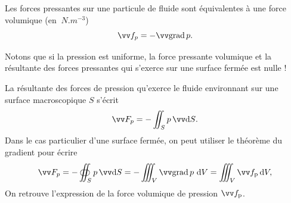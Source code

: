 \documentclass[12pt,fancy]{cours}
\begin{document}
\begin{theorem}\label{form:stat_flu}
  Les forces pressantes sur une particule de fluide sont équivalentes à une force volumique (en $\SI{}{N.m^{-3}}$)
  \begin{equation*}
    \Vec{f_p} = -\Grad{p}.
  \end{equation*}
\end{theorem}
\begin{remarque}
  Notons que si la pression est uniforme, la force pressante volumique et la résultante des forces pressantes qui s'exerce sur une surface fermée est nulle !
\end{remarque}

\begin{remarque}
  
  La résultante des forces de pression qu'exerce le fluide environnant sur une surface macroscopique $S$ s'écrit
  \begin{equation}
    \Vec{F_p}=-\iint_{S}p \,\Vec{\d S}.
  \end{equation}
  Dans le cas particulier d’une surface fermée, on peut utiliser le théorème du gradient pour écrire
  \begin{equation}\label{eq:force_press}
    \Vec{F_p}=-\oiint_{S}p \,\Vec{\d S}= -\iiint_{V}\Grad{p}\,\,\d V = \iiint_{V}\Vec{f}_{\rm p}\,\d V,
  \end{equation}
  On retrouve l’expression de la force volumique de pression $\Vec{f}_{\rm p}$.
\end{remarque}
  


\end{document}
